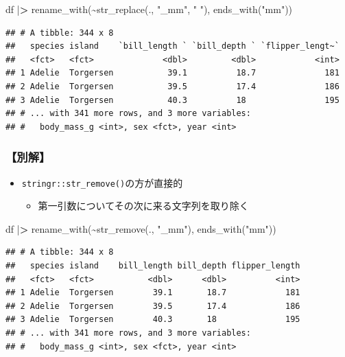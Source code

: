 \documentclass[
  xelatex,ja=standard, b5paper]{bxjsbook}
\newenvironment{Shaded}{\begin{snugshade}}{\end{snugshade}}
\newcommand{\ErrorTok}[1]{\textcolor[rgb]{0.64,0.00,0.00}{\textbf{#1}}}
\newcommand{\FunctionTok}[1]{\textcolor[rgb]{0.00,0.00,0.00}{#1}}
\newcommand{\NormalTok}[1]{#1}
\newcommand{\SpecialCharTok}[1]{\textcolor[rgb]{0.00,0.00,0.00}{#1}}
\newcommand{\StringTok}[1]{\textcolor[rgb]{0.31,0.60,0.02}{#1}}
\providecommand{\tightlist}{%
  \setlength{\itemsep}{0pt}\setlength{\parskip}{0pt}}
\begin{document}
\begin{Shaded}
\begin{Highlighting}[]
\NormalTok{df }\SpecialCharTok{|}\ErrorTok{\textgreater{}} 
  \FunctionTok{rename\_with}\NormalTok{(}\SpecialCharTok{\textasciitilde{}}\FunctionTok{str\_replace}\NormalTok{(., }\StringTok{"\_mm"}\NormalTok{, }\StringTok{" "}\NormalTok{),}
              \FunctionTok{ends\_with}\NormalTok{(}\StringTok{"mm"}\NormalTok{))}
\end{Highlighting}
\end{Shaded}

\begin{verbatim}
## # A tibble: 344 x 8
##   species island    `bill_length ` `bill_depth ` `flipper_lengt~`
##   <fct>   <fct>              <dbl>         <dbl>            <int>
## 1 Adelie  Torgersen           39.1          18.7              181
## 2 Adelie  Torgersen           39.5          17.4              186
## 3 Adelie  Torgersen           40.3          18                195
## # ... with 341 more rows, and 3 more variables:
## #   body_mass_g <int>, sex <fct>, year <int>
\end{verbatim}

\hypertarget{ux5225ux89e3}{%
\subsubsection{【別解】}\label{ux5225ux89e3}}

\begin{itemize}
\tightlist
\item
  \texttt{stringr::str\_remove()}の方が直接的

  \begin{itemize}
  \tightlist
  \item
    第一引数についてその次に来る文字列を取り除く
  \end{itemize}
\end{itemize}

\begin{Shaded}
\begin{Highlighting}[]
\NormalTok{df }\SpecialCharTok{|}\ErrorTok{\textgreater{}} 
  \FunctionTok{rename\_with}\NormalTok{(}\SpecialCharTok{\textasciitilde{}}\FunctionTok{str\_remove}\NormalTok{(., }\StringTok{"\_mm"}\NormalTok{),}
              \FunctionTok{ends\_with}\NormalTok{(}\StringTok{"mm"}\NormalTok{))}
\end{Highlighting}
\end{Shaded}

\begin{verbatim}
## # A tibble: 344 x 8
##   species island    bill_length bill_depth flipper_length
##   <fct>   <fct>           <dbl>      <dbl>          <int>
## 1 Adelie  Torgersen        39.1       18.7            181
## 2 Adelie  Torgersen        39.5       17.4            186
## 3 Adelie  Torgersen        40.3       18              195
## # ... with 341 more rows, and 3 more variables:
## #   body_mass_g <int>, sex <fct>, year <int>
\end{verbatim}
\end{document}

